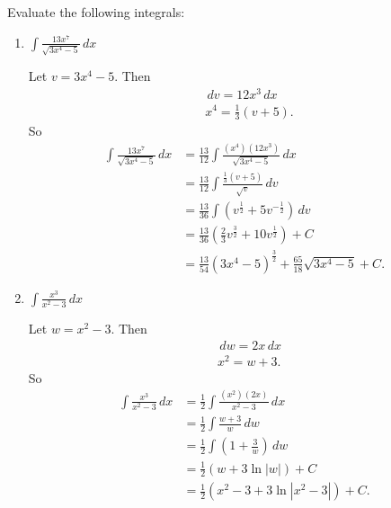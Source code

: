 \documentclass[nooutcomes, handout]{ximera}
\renewcommand{\d}{\,d}
\begin{document}
\begin{problem}
Evaluate the following integrals:

	\begin{enumerate}
	
	\item  $\int \frac{13x^7}{\sqrt{3x^4-5}} \d x$
		\begin{freeResponse}
		Let $v = 3x^4 - 5$.  Then
			\begin{align*}
			&\d v = 12 x^3 \d x  \\
			&x^4 = \frac{1}{3} (v + 5).
			\end{align*}
		So
			\begin{align*}
			\int \frac{13x^7}{\sqrt{3x^4-5}} \d x &= \frac{13}{12} \int \frac{(x^4)(12 x^3)}{\sqrt{3x^4-5}} \d x  \\
			&= \frac{13}{12} \int \frac{\frac{1}{3} (v+5)}{\sqrt{v}} \d v  \\
			&= \frac{13}{36} \int \left( v^{\frac{1}{2}} + 5v^{-\frac{1}{2}} \right) \d v  \\
			&= \frac{13}{36} \left( \frac{2}{3} v^{\frac{3}{2}} + 10 v^{\frac{1}{2}} \right) + C  \\
			&= \frac{13}{54} (3x^4-5)^{\frac{3}{2}} + \frac{65}{18} \sqrt{3x^4 - 5} + C.
			\end{align*}
		\end{freeResponse}
		
		
		
	\item  $\int \frac{x^3}{x^2 - 3} \d x$
		\begin{freeResponse}
		Let $w = x^2 - 3$.  Then
			\begin{align*}
			&\d w = 2x \d x  \\
			&x^2 = w + 3.
			\end{align*}
		So
			\begin{align*}
			\int \frac{x^3}{x^2 - 3} \d x &= \frac{1}{2} \int \frac{(x^2)(2x)}{x^2 - 3} \d x  \\
			&= \frac{1}{2} \int \frac{w+3}{w} \d w  \\
			&= \frac{1}{2} \int \left(1 + \frac{3}{w} \right) \d w  \\
			&= \frac{1}{2} \left( w + 3 \ln|w| \right) + C  \\
			&= \frac{1}{2} \left( x^2 - 3 + 3\ln|x^2-3| \right) + C.
			\end{align*}
		\end{freeResponse}
		
		
		
	\end{enumerate}
			
			
	
\end{problem}
\end{document}
